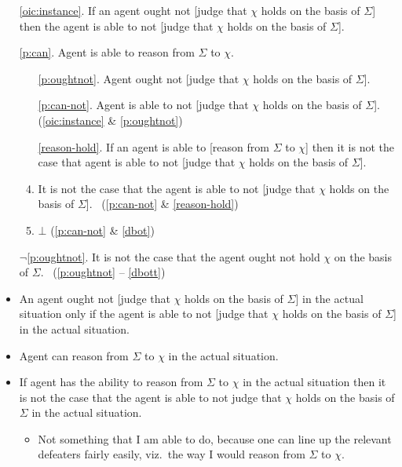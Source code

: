 \documentclass[10pt]{article}
\begin{document}
\begin{enumerate}
\item[\ref{oic:instance}.] If an agent ought not [judge that \(\chi\) holds on the basis of \(\Sigma\)] then the agent is able to not [judge that \(\chi\) holds on the basis of \(\Sigma\)].
\item[\ref{p:can}.] Agent is able to reason from \(\Sigma\) to \(\chi\).
  \begin{enumerate}[ref=\alph*.]
  \item[\ref{p:oughtnot}.] Agent ought not [judge that \(\chi\) holds on the basis of \(\Sigma\)].
  \item[\ref{p:can-not}.] Agent is able to not [judge that \(\chi\) holds on the basis of \(\Sigma\)]. \hfill (\ref{oic:instance} \& \ref{p:oughtnot})
  \item[\ref{reason-hold}.] If an agent is able to [reason from \(\Sigma\) to \(\chi\)] then it is not the case that agent is able to not [judge that \(\chi\) holds on the basis of \(\Sigma\)].
  \item\label{dbot} It is not the case that the agent is able to not [judge that \(\chi\) holds on the basis of \(\Sigma\)].
  \mbox{ }\hfill (\ref{p:can-not} \& \ref{reason-hold})
  \item\label{dbott} \(\bot\) \hfill (\ref{p:can-not} \& \ref{dbot})
  \end{enumerate}
\item[\(\lnot\)\ref{p:oughtnot}.] It is not the case that the agent ought not hold \(\chi\) on the basis of \(\Sigma\).\linebreak
  \mbox{ }\hfill (\ref{p:oughtnot} -- \ref{dbott})
\end{enumerate}

\begin{itemize}
\item An agent ought not [judge that \(\chi\) holds on the basis of \(\Sigma\)] in the actual situation only if the agent is able to not [judge that \(\chi\) holds on the basis of \(\Sigma\)] in the actual situation.
\item Agent can reason from \(\Sigma\) to \(\chi\) in the actual situation.
\item If agent has the ability to reason from \(\Sigma\) to \(\chi\) in the actual situation then it is not the case that the agent is able to not judge that \(\chi\) holds on the basis of \(\Sigma\) in the actual situation.
  \begin{itemize}
  \item Not something that I am able to do, because one can line up the relevant defeaters fairly easily, viz.\ the way I would reason from \(\Sigma\) to \(\chi\).
  \end{itemize}
\end{itemize}
\end{document}
